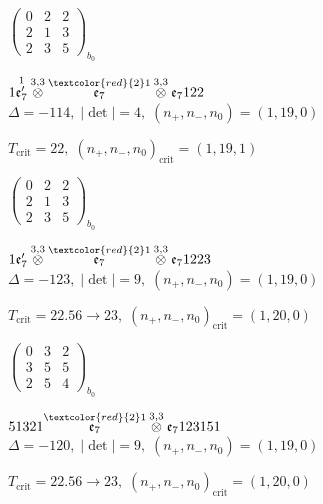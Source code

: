 \documentclass[10pt]{article}
\begin{document}
\hspace{2em}$\left(\begin{smallmatrix}0 & 2 & 2 \\ 2 & 1 & 3 \\ 2 & 3 & 5\end{smallmatrix}\right)_{\!b_0}$

\smallskip

$1\overset{1}{\mathfrak{e}_7'}\overset{3,3}{\otimes}\overset{\textcolor{red}{2}1}{\mathfrak{e}_7}\overset{3,3}{\otimes}\mathfrak{e}_7122$ \quad $\Delta=-114,\; |\det|=4,\; (n_+,n_-,n_0)=(1,19,0)$

\hspace{1em}$T_{\text{crit}}=22,\; (n_+,n_-,n_0)_{\text{crit}}=(1,19,1)$

\hspace{2em}$\left(\begin{smallmatrix}0 & 2 & 2 \\ 2 & 1 & 3 \\ 2 & 3 & 5\end{smallmatrix}\right)_{\!b_0}$

\smallskip

$1\mathfrak{e}_7'\overset{3,3}{\otimes}\overset{\textcolor{red}{2}1}{\mathfrak{e}_7}\overset{3,3}{\otimes}\mathfrak{e}_71223$ \quad $\Delta=-123,\; |\det|=9,\; (n_+,n_-,n_0)=(1,19,0)$

\hspace{1em}$T_{\text{crit}}=22.56 \to 23,\; (n_+,n_-,n_0)_{\text{crit}}=(1,20,0)$

\hspace{2em}$\left(\begin{smallmatrix}0 & 3 & 2 \\ 3 & 5 & 5 \\ 2 & 5 & 4\end{smallmatrix}\right)_{\!b_0}$

\smallskip

$51321\overset{\textcolor{red}{2}1}{\mathfrak{e}_7}\overset{3,3}{\otimes}\mathfrak{e}_7123151$ \quad $\Delta=-120,\; |\det|=9,\; (n_+,n_-,n_0)=(1,19,0)$

\hspace{1em}$T_{\text{crit}}=22.56 \to 23,\; (n_+,n_-,n_0)_{\text{crit}}=(1,20,0)$
\end{document}
